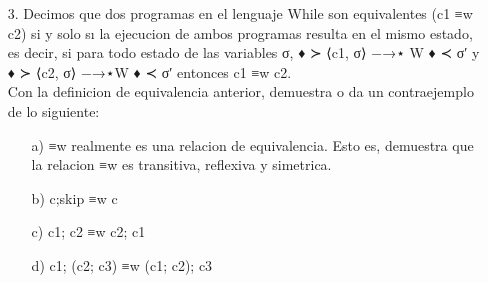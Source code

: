 \documentclass{article}
\begin{document}
\begin{itemize}
        \item[3.] Decimos que dos programas en el lenguaje While son equivalentes (c1 ≡w c2) si y solo sı la ejecucion de ambos programas resulta en el mismo estado, es decir, si para todo estado de las variables σ, ♦ ≻ ⟨c1, σ⟩ −→⋆ W ♦ ≺ σ′ y ♦ ≻ ⟨c2, σ⟩ −→⋆W ♦ ≺ σ′ entonces c1 ≡w c2.\\
        Con la definicion de equivalencia anterior, demuestra o da un contraejemplo de lo siguiente:
        \begin{itemize}
            \item[a)] ≡w realmente es una relacion de equivalencia. Esto es, demuestra que la relacion ≡w es transitiva, reflexiva y simetrica.
            \item[b)] c;skip ≡w c
            \item[c)] c1; c2 ≡w c2; c1
            \item[d)] c1; (c2; c3) ≡w (c1; c2); c3 
        \end{itemize}
    \end{itemize}
\end{document}
